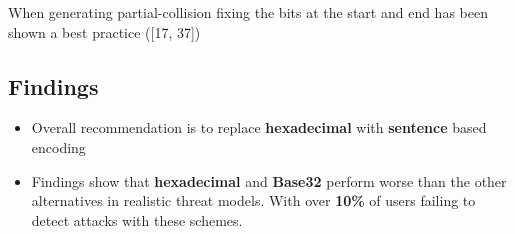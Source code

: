 When generating partial-collision fixing the bits at the start and end has been shown a best practice ([17, 37])

\subsection{Findings}
\begin{itemize}
    \item Overall recommendation is to replace \textbf{hexadecimal} with \textbf{sentence} based encoding
    \item Findings show that \textbf{hexadecimal} and \textbf{Base32} perform worse than the other alternatives in realistic threat models. With over \textbf{10\%} of users failing to detect attacks with these schemes.
\end{itemize}